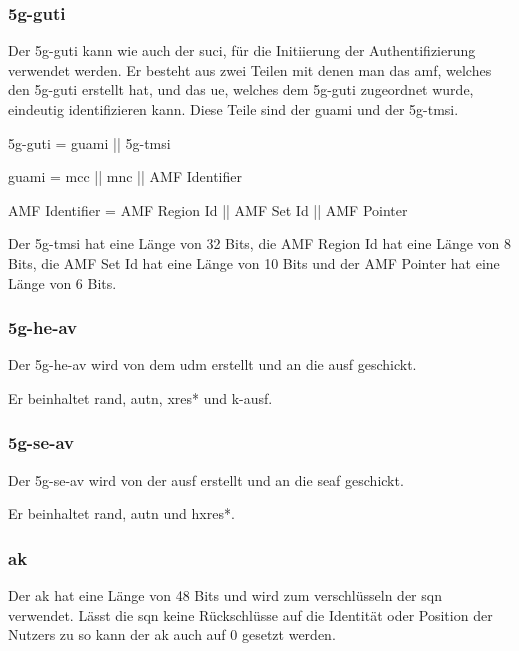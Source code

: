 \subsubsection{\gls{5g-guti}}
Der \gls{5g-guti} kann wie auch der \gls{suci}, f\"ur die Initiierung der Authentifizierung verwendet werden.
Er besteht aus zwei Teilen mit denen man das \gls{amf}, welches den \gls{5g-guti} erstellt hat, und das \gls{ue}, welches dem \gls{5g-guti} zugeordnet wurde, eindeutig identifizieren kann. %
Diese Teile sind der \gls{guami} und der \gls{5g-tmsi}.

\gls{5g-guti} = \gls{guami} || \gls{5g-tmsi}

\gls{guami} = \gls{mcc} || \gls{mnc} || AMF Identifier

AMF Identifier = AMF Region Id || AMF Set Id || AMF Pointer

Der \gls{5g-tmsi} hat eine L\"ange von 32 Bits, die AMF Region Id hat eine L\"ange von 8 Bits, die AMF Set Id hat eine L\"ange von 10 Bits und der AMF Pointer hat eine L\"ange von 6 Bits. %

\subsubsection{\gls{5g-he-av}}
Der \gls{5g-he-av} wird von dem \gls{udm} erstellt und an die \gls{ausf} geschickt.

Er beinhaltet \gls{rand}, \gls{autn}, \gls{xres*} und \gls{k-ausf}. %

\subsubsection{\gls{5g-se-av}}
Der \gls{5g-se-av} wird von der \gls{ausf} erstellt und an die \gls{seaf} geschickt.

Er beinhaltet \gls{rand}, \gls{autn} und \gls{hxres*}. %

\subsubsection{\gls{ak}}
Der \gls{ak} hat eine L\"ange von 48 Bits und wird zum verschl\"usseln der \gls{sqn} verwendet. %
L\"asst die \gls{sqn} keine R\"uckschl\"usse auf die Identit\"at oder Position der Nutzers zu so kann der \gls{ak} auch auf 0 gesetzt werden. %

